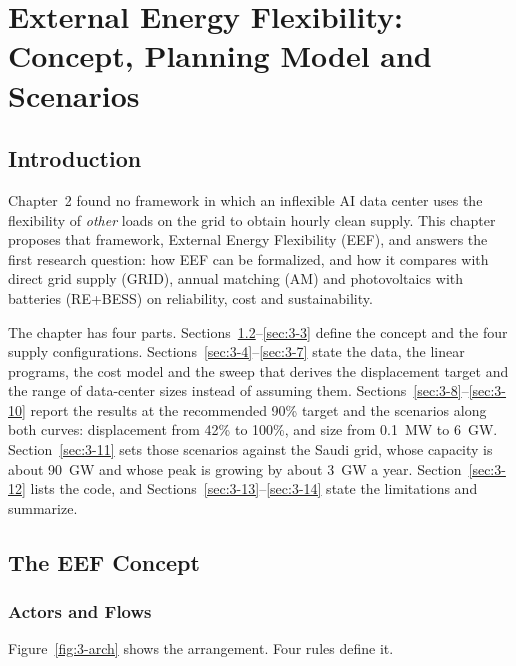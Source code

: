 \chapter{External Energy Flexibility: Concept, Planning Model and Scenarios}\label{ch:model}

\section{Introduction}\label{sec:3-1}

Chapter~2 found no framework in which an inflexible AI data center uses the flexibility of \emph{other} loads on the grid to obtain hourly clean supply. This chapter proposes that framework, External Energy Flexibility (EEF), and answers the first research question: how EEF can be formalized, and how it compares with direct grid supply (GRID), annual matching (AM) and photovoltaics with batteries (RE+BESS) on reliability, cost and sustainability.

The chapter has four parts. Sections~\ref{sec:3-2}--\ref{sec:3-3} define the concept and the four supply configurations. Sections~\ref{sec:3-4}--\ref{sec:3-7} state the data, the linear programs, the cost model and the sweep that derives the displacement target and the range of data-center sizes instead of assuming them. Sections~\ref{sec:3-8}--\ref{sec:3-10} report the results at the recommended 90\% target and the scenarios along both curves: displacement from 42\% to 100\%, and size from 0.1~MW to 6~GW. Section~\ref{sec:3-11} sets those scenarios against the Saudi grid, whose capacity is about 90~GW and whose peak is growing by about 3~GW a year. Section~\ref{sec:3-12} lists the code, and Sections~\ref{sec:3-13}--\ref{sec:3-14} state the limitations and summarize.

\section{The EEF Concept}\label{sec:3-2}

\subsection{Actors and Flows}

Figure~\ref{fig:3-arch} shows the arrangement. Four rules define it.

